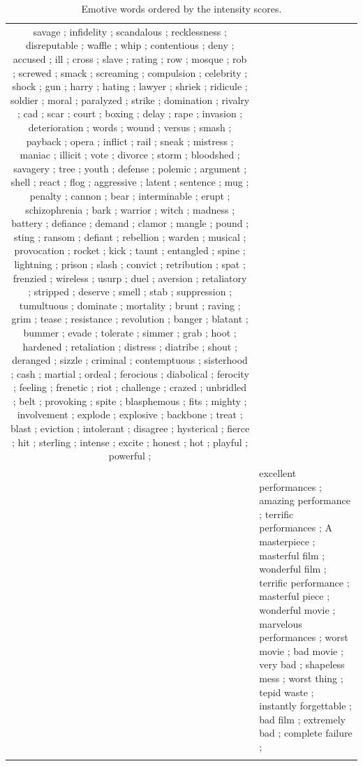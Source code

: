 \documentclass[11pt]{article}
\begin{document}
\begin{table}[th]
\begin{center}
\begin{tabular}{c @{\hspace{0pt}}  @{\hspace{15pt}}p{}}
savage	;
infidelity	;
scandalous	;
recklessness	;
disreputable	;
waffle	;
whip	;
contentious	;
deny	;
accused	;
ill	;
cross	;
slave	;
rating	;
row	;
mosque	;
rob	;
screwed	;
smack	;
screaming	;
compulsion	;
celebrity	;
shock	;
gun	;
harry	;
hating	;
lawyer	;
shriek	;
ridicule	;
soldier	;
moral	;
paralyzed	;
strike	;
domination	;
rivalry	;
cad	;
scar	;
court	;
boxing	;
delay	;
rape	;
invasion	;
deterioration	;
words	;
wound	;
versus	;
smash	;
payback	;
opera	;
inflict	;
rail	;
sneak	;
mistress	;
maniac	;
illicit	;
vote	;
divorce	;
storm	;
bloodshed	;
savagery	;
tree	;
youth	;
defense	;
polemic	;
argument	;
shell	;
react	;
flog	;
aggressive	;
latent	;
sentence	;
mug	;
penalty	;
cannon	;
bear	;
interminable	;
erupt	;
schizophrenia	;
bark	;
warrior	;
witch	;
madness	;
battery	;
defiance	;
demand	;
clamor	;
mangle	;
pound	;
sting	;
ransom	;
defiant	;
rebellion	;
warden	;
musical	;
provocation	;
rocket	;
kick	;
taunt	;
entangled	;
spine	;
lightning	;
prison	;
slash	;
convict	;
retribution	;
spat	;
frenzied	;
wireless	;
usurp	;
duel	;
aversion	;
retaliatory	;
stripped	;
deserve	;
smell	;
stab	;
suppression	;
tumultuous	;
dominate	;
mortality	;
brunt	;
raving	;
grim	;
tease	;
resistance	;
revolution	;
banger	;
blatant	;
bummer	;
evade	;
tolerate	;
simmer	;
grab	;
hoot	;
hardened	;
retaliation	;
distress	;
diatribe	;
shout	;
deranged	;
sizzle	;
criminal	;
contemptuous	;
sisterhood	;
cash	;
martial	;
ordeal	;
ferocious	;
diabolical	;
ferocity	;
feeling	;
frenetic	;
riot	;
challenge	;
crazed	;
unbridled	;
belt	;
provoking	;
spite	;
blasphemous	;
fits	;
mighty	;
involvement	;
explode	;
explosive	;
backbone	;
treat	;
blast	;
eviction	;
intolerant	;
disagree	;
hysterical	;
fierce	;
hit	;
sterling	;
intense	;
excite	;
honest	;
hot	;
playful	;
powerful	;


\\ \addlinespace
2 &
excellent performances ; 
amazing performance ; 
terrific performances ; 
A masterpiece ; 
masterful film ; 
wonderful film ; 
terrific performance ; 
masterful piece ; 
wonderful movie ; 
marvelous performances ; 
worst movie ; 
bad movie ; 
very bad ; 
shapeless mess ; 
worst thing ; 
tepid waste ; 
instantly forgettable ; 
bad film ; 
extremely bad ; 
complete failure ; 


\\\addlinespace\bottomrule[.12em]
\end{tabular}
\caption{Emotive words ordered by the intensity scores.}
\label{table:exPolarity}
\vspace{.4cm}
\end{center}
\end{table}
\end{document}
